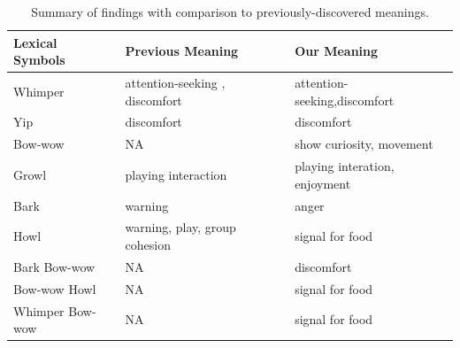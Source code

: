 

\begin{table}[th]
\small
\centering
\begin{tabular}{p{}|p{}|p{}}
\toprule
\textbf{Lexical Symbols} & \textbf{Previous Meaning} & \textbf{Our Meaning}\\
\hline
Whimper & attention-seeking \cite{handelman2012canine},
				discomfort \cite{web2018dog} & attention-seeking,discomfort \\
\hline
Yip & discomfort ~\cite{web2018yip} & discomfort \\
\hline
Bow-wow & NA & show curiosity, movement\\
\hline
Growl & playing interaction ~\cite{handelman2012canine} & playing interation, enjoyment \\
\hline
Bark & warning \cite{handelman2012canine} & anger \\
\hline
Howl & warning, play, group cohesion ~\cite{ani8080131} & signal for food \\
\hline
Bark Bow-wow & NA & discomfort \\
\hline
Bow-wow Howl & NA & signal for food \\
\hline
Whimper Bow-wow & NA & signal for food \\
\bottomrule
\end{tabular}
\caption{Summary of findings with comparison to previously-discovered meanings.}
\label{tab:finding}
\end{table}




